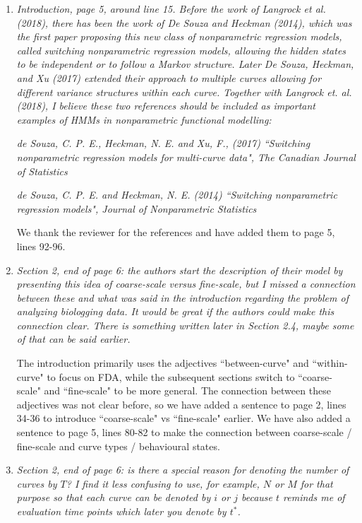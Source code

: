 \documentclass{article}
\begin{document}
\begin{enumerate}
    \item \textit{Introduction, page 5, around line 15. Before the work of Langrock et al. (2018), there has been the work of De Souza and Heckman (2014), which was the first paper proposing this new class of nonparametric regression models, called switching nonparametric regression models, allowing the hidden states to be independent or to follow a Markov structure. Later De Souza, Heckman, and Xu (2017) extended their approach to multiple curves allowing for different variance structures within each curve. Together with Langrock et. al. (2018), I believe these two references should be included as important examples of HMMs in nonparametric functional modelling:}
    
    \textit{de Souza, C. P. E., Heckman, N. E. and Xu, F., (2017) ``Switching nonparametric regression models for multi-curve data", The Canadian Journal of Statistics}

    \textit{de Souza, C. P. E. and Heckman, N. E. (2014) ``Switching nonparametric regression models", Journal of Nonparametric Statistics}
    
    We thank the reviewer for the references and have added them to page 5, lines 92-96.
    
    \item \textit{Section 2, end of page 6: the authors start the description of their model by presenting this idea of coarse-scale versus fine-scale, but I missed a connection between these and what was said in the introduction regarding the problem of analyzing biologging data. It would be great if the authors could make this connection clear. There is something written later in Section 2.4, maybe some of that can be said earlier.}
    
    The introduction primarily uses the adjectives ``between-curve" and ``within-curve" to focus on FDA, while the subsequent sections switch to ``coarse-scale" and ``fine-scale" to be more general. The connection between these adjectives was not clear before, so we have added a sentence to page 2, lines 34-36 to introduce ``coarse-scale" vs ``fine-scale" earlier. We have also added a sentence to page 5, lines 80-82 to make the connection between coarse-scale / fine-scale and curve types / behavioural states.
    
    \item \textit{Section 2, end of page 6: is there a special reason for denoting the number of curves by $T$? I find it less confusing to use, for example, $N$ or $M$ for that purpose so that each curve can be denoted by $i$ or $j$ because $t$ reminds me of evaluation time points which later you denote by $t^*$.}
    

\end{enumerate}
\end{document}
